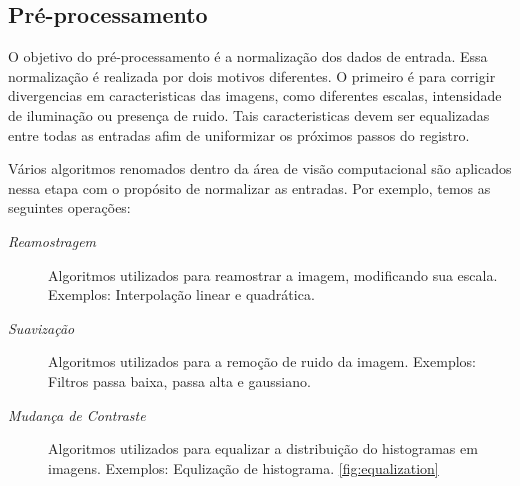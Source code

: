 \subsection{Pré-processamento}
  O objetivo do pré-processamento é a normalização dos dados de entrada. Essa
normalização é realizada por dois motivos diferentes. O primeiro é para corrigir
divergencias em caracteristicas das imagens, como diferentes escalas, intensidade
de iluminação ou presença de ruido. Tais caracteristicas devem ser equalizadas
entre todas as entradas afim de uniformizar os próximos passos do registro.

Vários algoritmos renomados dentro da área de visão computacional são aplicados
nessa etapa com o propósito de normalizar as entradas. Por exemplo, temos
as seguintes operações:

\begin{description}
    \item [\textit{Reamostragem}] Algoritmos utilizados para reamostrar a imagem,
          modificando sua escala. Exemplos: Interpolação linear e quadrática.
    \item [\textit{Suavização}] Algoritmos utilizados para a remoção de ruido da
          imagem. Exemplos: Filtros passa baixa, passa alta e gaussiano.
    \item [\textit{Mudança de Contraste}] Algoritmos utilizados para equalizar
          a distribuição do histogramas em imagens. Exemplos: Equlização de histograma.
          \ref{fig:equalization}
\end{description}

